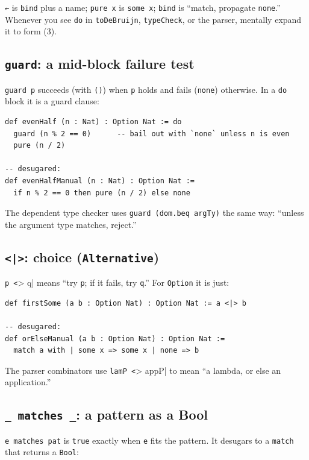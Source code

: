\documentclass[11pt,a4paper]{article}
\theoremstyle{definition}
\begin{document}
\verb|←| is \texttt{bind} plus a name; \texttt{pure x} is \texttt{some x};
\texttt{bind} is ``match, propagate \texttt{none}.'' Whenever you see \texttt{do}
in \texttt{toDeBruijn}, \texttt{typeCheck}, or the parser, mentally expand it to
form (3).

\subsection*{\texttt{guard}: a mid-block failure test}

\texttt{guard p} succeeds (with \texttt{()}) when \texttt{p} holds and fails
(\texttt{none}) otherwise. In a \texttt{do} block it is a guard clause:

\begin{verbatim}
def evenHalf (n : Nat) : Option Nat := do
  guard (n % 2 == 0)      -- bail out with `none` unless n is even
  pure (n / 2)

-- desugared:
def evenHalfManual (n : Nat) : Option Nat :=
  if n % 2 == 0 then pure (n / 2) else none
\end{verbatim}

The dependent type checker uses \texttt{guard (dom.beq argTy)} the same way:
``unless the argument type matches, reject.''

\subsection*{\texttt{<|>}: choice (\texttt{Alternative})}

\verb|p <|> q| means ``try \texttt{p}; if it fails, try \texttt{q}.'' For
\texttt{Option} it is just:

\begin{verbatim}
def firstSome (a b : Option Nat) : Option Nat := a <|> b

-- desugared:
def orElseManual (a b : Option Nat) : Option Nat :=
  match a with | some x => some x | none => b
\end{verbatim}

The parser combinators use \verb|lamP <|> appP| to mean ``a lambda, or else an
application.''

\subsection*{\texttt{\_ matches \_}: a pattern as a Bool}

\verb|e matches pat| is \texttt{true} exactly when \texttt{e} fits the pattern.
It desugars to a \texttt{match} that returns a \texttt{Bool}:
\end{document}
